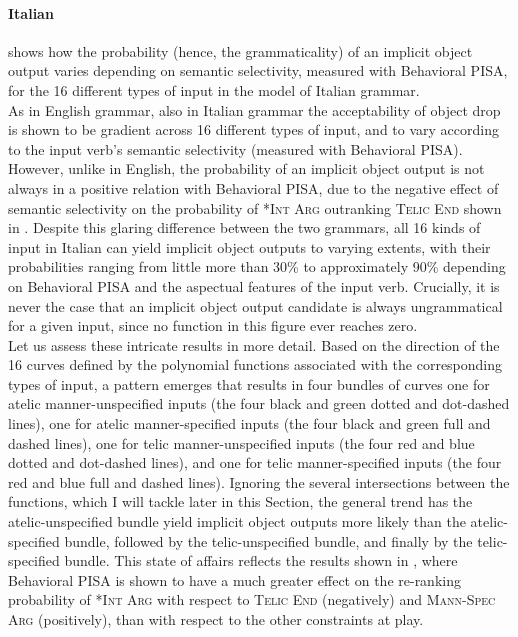 \paragraph{Italian} 
 shows how the probability (hence, the grammaticality) of an implicit object output varies depending on semantic selectivity, measured with Behavioral PISA, for the 16 different types of input in the model of Italian grammar.\\
As in English grammar, also in Italian grammar the acceptability of object drop is shown to be gradient across 16 different types of input, and to vary according to the input verb's semantic selectivity (measured with Behavioral PISA). However, unlike in English, the probability of an implicit object output is not always in a positive relation with Behavioral PISA, due to the negative effect of semantic selectivity on the probability of \textsc{*Int Arg} outranking \textsc{Telic End} shown in . Despite this glaring difference between the two grammars, all 16 kinds of input in Italian can yield implicit object outputs to varying extents, with their probabilities ranging from little more than 30\% to approximately 90\% depending on Behavioral PISA and the aspectual features of the input verb. Crucially, it is never the case that an implicit object output candidate is always ungrammatical for a given input, since no function in this figure ever reaches zero.\\
Let us assess these intricate results in more detail. Based on the direction of the 16 curves defined by the polynomial functions associated with the corresponding types of input, a pattern emerges that results in four bundles of curves \textemdash one for atelic manner-unspecified inputs (the four black and green dotted and dot-dashed lines), one for atelic manner-specified inputs (the four black and green full and dashed lines), one for telic manner-unspecified inputs (the four red and blue dotted and dot-dashed lines), and one for telic manner-specified inputs (the four red and blue full and dashed lines). Ignoring the several intersections between the functions, which I will tackle later in this Section, the general trend has the atelic-unspecified bundle yield implicit object outputs more likely than the atelic-specified bundle, followed by the telic-unspecified bundle, and finally by the telic-specified bundle. This state of affairs reflects the results shown in , where Behavioral PISA is shown to have a much greater effect on the re-ranking probability of \textsc{*Int Arg} with respect to \textsc{Telic End} (negatively) and \textsc{Mann-Spec Arg} (positively), than with respect to the other constraints at play.

